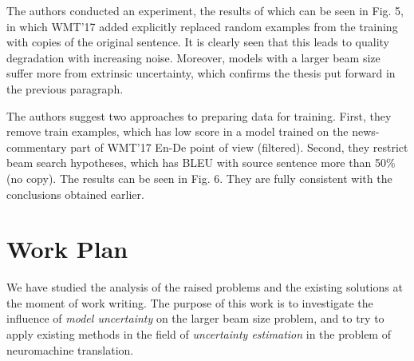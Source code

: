 \documentclass[a4paper,14pt]{extarticle}
\begin{document}
	\begin{figure}[t]
	\end{figure}
	
	The authors conducted an experiment, the results of which can be seen in Fig. 5, in which WMT'17 added explicitly replaced random examples from the training with copies of the original sentence. It is clearly seen that this leads to quality degradation with increasing noise. Moreover, models with a larger beam size suffer more from extrinsic uncertainty, which confirms the thesis put forward in the previous paragraph.
	
	The authors suggest two approaches to preparing data for training. First, they remove train examples, which has low score in a model trained on the news-commentary part of WMT'17 En-De point of view (filtered). Second, they restrict beam search hypotheses, which has BLEU with source sentence more than 50\% (no copy). The results can be seen in Fig. 6. They are fully consistent with the conclusions obtained earlier.
	
	\section{Work Plan}
	We have studied the analysis of the raised problems and the existing solutions at the moment of work writing. The purpose of this work is to investigate the influence of \textit{model uncertainty} on the larger beam size problem, and to try to apply existing methods in the field of \textit{uncertainty estimation} in the problem of neuromachine translation.
	
\end{document}
